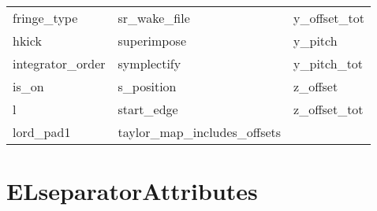 \begin{tabular}{lll}
fringe_type                 & sr_wake_file                & y_offset_tot                \\
hkick                       & superimpose                 & y_pitch                     \\
integrator_order            & symplectify                 & y_pitch_tot                 \\
is_on                       & s_position                  & z_offset                    \\
l                           & start_edge                  & z_offset_tot                \\
lord_pad1                   & taylor_map_includes_offsets &                             \\
 \bottomrule
 \end{tabular}
 \vfill
 
 \section{ELseparatorAttributes}
 \label{s:list.elseparator}
 
